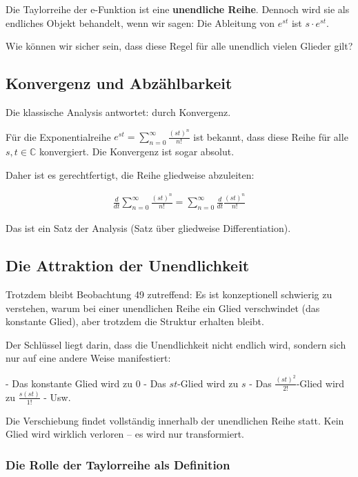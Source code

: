 \documentclass[a4paper, 12pt, twoside, openright]{report}
\theoremstyle{definition}
\theoremstyle{definition}
\begin{document}
Die Taylorreihe der e-Funktion ist eine \textbf{unendliche Reihe}. Dennoch wird sie als endliches Objekt behandelt, wenn wir sagen: Die Ableitung von $e^{st}$ ist $s \cdot e^{st}$.

Wie können wir sicher sein, dass diese Regel für alle unendlich vielen Glieder gilt?

\subsection{Konvergenz und Abzählbarkeit}

Die klassische Analysis antwortet: durch Konvergenz. 

Für die Exponentialreihe $e^{st} = \sum_{n=0}^{\infty} \frac{(st)^n}{n!}$ ist bekannt, dass diese Reihe für alle $s, t \in \mathbb{C}$ konvergiert. Die Konvergenz ist sogar absolut.

Daher ist es gerechtfertigt, die Reihe gliedweise abzuleiten:

\begin{align}
	\frac{d}{dt} \sum_{n=0}^{\infty} \frac{(st)^n}{n!} = \sum_{n=0}^{\infty} \frac{d}{dt} \frac{(st)^n}{n!}
\end{align}

Das ist ein Satz der Analysis (Satz über gliedweise Differentiation).

\subsection{Die Attraktion der Unendlichkeit}

Trotzdem bleibt Beobachtung 49 zutreffend: Es ist konzeptionell schwierig zu verstehen, warum bei einer unendlichen Reihe ein Glied verschwindet (das konstante Glied), aber trotzdem die Struktur erhalten bleibt.

Der Schlüssel liegt darin, dass die Unendlichkeit nicht endlich wird, sondern sich nur auf eine andere Weise manifestiert:

- Das konstante Glied wird zu 0
- Das $st$-Glied wird zu $s$
- Das $\frac{(st)^2}{2!}$-Glied wird zu $\frac{s(st)}{1!}$
- Usw.

Die Verschiebung findet vollständig innerhalb der unendlichen Reihe statt. Kein Glied wird wirklich verloren -- es wird nur transformiert.

\subsubsection*{Die Rolle der Taylorreihe als Definition}
\end{document}
